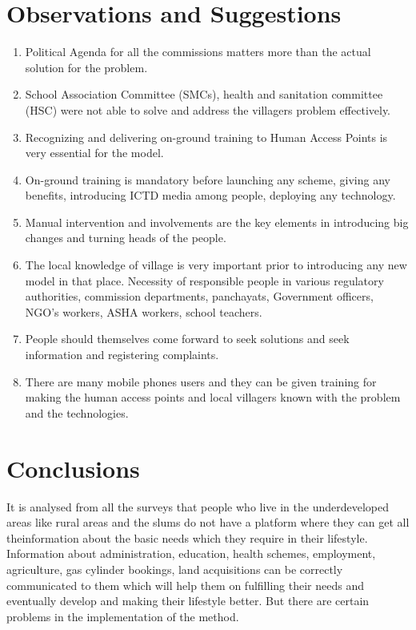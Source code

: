 \section {Observations and Suggestions}

\begin{enumerate}
\item Political Agenda for all the commissions matters more than the actual solution for the problem.
\item School Association Committee (SMCs), health and sanitation committee (HSC) were not able to solve and address the villagers problem effectively.
\item Recognizing and delivering on-ground training to Human Access Points is very essential for the model.

\item On-ground training is mandatory before launching any scheme, giving any
benefits, introducing ICTD media among people, deploying any technology.
\item Manual intervention and involvements are the key elements in introducing
big changes and turning heads of the people.
\item The local knowledge of village is very important prior to introducing any new
model in that place.
Necessity of responsible people in various regulatory authorities, commission
departments, panchayats, Government officers, NGO’s workers, ASHA
workers, school teachers.
\item People should themselves come forward to seek solutions and seek
information and registering complaints.
\item There are many mobile phones users and they can be given training for
making the human access points and local villagers known with the problem
and the technologies.
\end{enumerate}

\section {Conclusions}
It is analysed from all the surveys that people who live in the underdeveloped areas
like rural areas and the slums do not have a platform where they can get all theinformation about the basic needs which they require in their lifestyle. Information
about administration, education, health schemes, employment, agriculture, gas
cylinder bookings, land acquisitions can be correctly communicated to them which
will help them on fulfilling their needs and eventually develop and making their
lifestyle better. But there are certain problems in the implementation of the
method.

